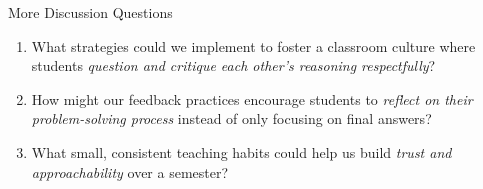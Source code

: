\documentclass[dvipsnames]{beamer}
\begin{document}
\begin{frame}{More Discussion Questions}
\begin{enumerate}
    \item What strategies could we implement to foster a classroom culture where students \emph{question and critique each other’s reasoning respectfully}?
    \item How might our feedback practices encourage students to \emph{reflect on their problem-solving process} instead of only focusing on final answers?
    \item What small, consistent teaching habits could help us build \emph{trust and approachability} over a semester?
\end{enumerate}
\end{frame}
\end{document}
